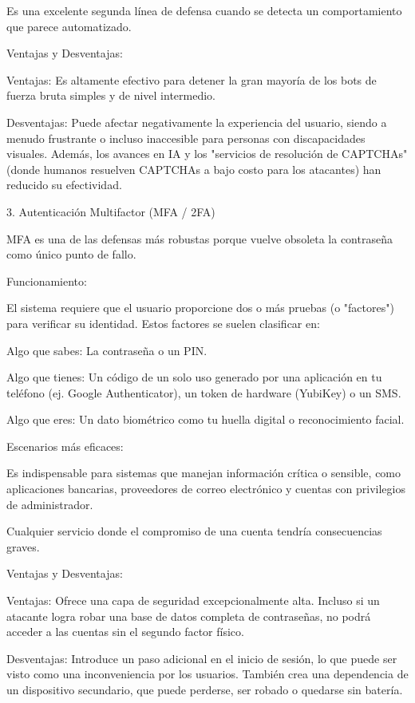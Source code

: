 \documentclass[letter,12pt]{article}
\begin{document}
        Es una excelente segunda línea de defensa cuando se detecta un comportamiento que parece automatizado.

    Ventajas y Desventajas:

        Ventajas: Es altamente efectivo para detener la gran mayoría de los bots de fuerza bruta simples y de nivel intermedio.

        Desventajas: Puede afectar negativamente la experiencia del usuario, siendo a menudo frustrante o incluso inaccesible para personas con discapacidades visuales. Además, los avances en IA y los "servicios de resolución de CAPTCHAs" (donde humanos resuelven CAPTCHAs a bajo costo para los atacantes) han reducido su efectividad.

3. Autenticación Multifactor (MFA / 2FA)

MFA es una de las defensas más robustas porque vuelve obsoleta la contraseña como único punto de fallo.

    Funcionamiento:

        El sistema requiere que el usuario proporcione dos o más pruebas (o "factores") para verificar su identidad. Estos factores se suelen clasificar en:

            Algo que sabes: La contraseña o un PIN.

            Algo que tienes: Un código de un solo uso generado por una aplicación en tu teléfono (ej. Google Authenticator), un token de hardware (YubiKey) o un SMS.

            Algo que eres: Un dato biométrico como tu huella digital o reconocimiento facial.

    Escenarios más eficaces:

        Es indispensable para sistemas que manejan información crítica o sensible, como aplicaciones bancarias, proveedores de correo electrónico y cuentas con privilegios de administrador.

        Cualquier servicio donde el compromiso de una cuenta tendría consecuencias graves.

    Ventajas y Desventajas:

        Ventajas: Ofrece una capa de seguridad excepcionalmente alta. Incluso si un atacante logra robar una base de datos completa de contraseñas, no podrá acceder a las cuentas sin el segundo factor físico.

        Desventajas: Introduce un paso adicional en el inicio de sesión, lo que puede ser visto como una inconveniencia por los usuarios. También crea una dependencia de un dispositivo secundario, que puede perderse, ser robado o quedarse sin batería.
\end{document}
